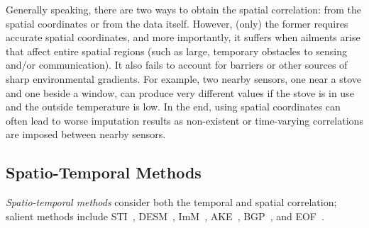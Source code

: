 Generally speaking, there are two ways to obtain the spatial
correlation: from the spatial coordinates or from the data itself.
However, (only) the former requires accurate spatial coordinates, and
more importantly, it suffers when ailments arise that affect entire
spatial regions (such as large, temporary obstacles to sensing and/or
communication).  It also fails to account for barriers or other
sources of sharp environmental gradients.  For example, two nearby
sensors, one near a stove and one beside a window, can produce very
different values if the stove is in use and the outside temperature is
low.  In the end, using spatial coordinates can often lead to worse
imputation results as non-existent or time-varying correlations are
imposed between nearby sensors.




\subsection{Spatio-Temporal Methods}   \label{sec:rw_spatial_temporal}
{\em Spatio-temporal methods} consider both the
temporal and spatial correlation; salient methods include
STI~\cite{Jian-Zhong:STI}, DESM~\cite{li2008data}, ImM~\cite{Lim:robust},
AKE~\cite{pan2010k}, BGP~\cite{osborne2012real}, and EOF~\cite{beckers2003eof, kondrashov2006spatio}.

